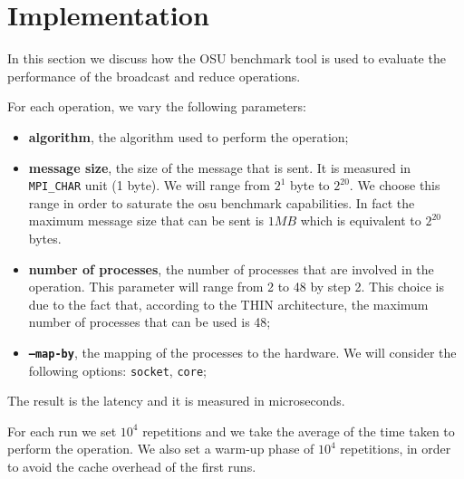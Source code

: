 \section{Implementation}

In this section we discuss how the OSU benchmark tool is used to evaluate the performance of the broadcast and reduce operations. 

For each operation, we vary the following parameters:
\begin{itemize}
    \item \textbf{algorithm}, the algorithm used to perform the operation;
    \item \textbf{message size}, the size of the message that is sent. It is measured in \texttt{MPI\_CHAR} unit (1 byte). We will range from $2^1$ byte to $2^{20}$. We choose this range in order to saturate the osu benchmark capabilities. In fact the maximum message size that can be sent is $1MB$ which is equivalent to $2^{20}$ bytes. 
    \item \textbf{number of processes}, the number of processes that are involved in the operation. This parameter will range from 2 to 48 by step 2. This choice is due to the fact that, according to the THIN architecture, the maximum number of processes that can be used is 48;
    \item \textbf{\texttt{--map-by}}, the mapping of the processes to the hardware. We will consider the following options: \texttt{socket}, \texttt{core};
\end{itemize}

The result is the latency and it is measured in microseconds. 

For each run we set $10^4$ repetitions and we take the average of the time taken to perform the operation. We also set a warm-up phase of $10^4$ repetitions, in order to avoid the cache overhead of the first runs.
